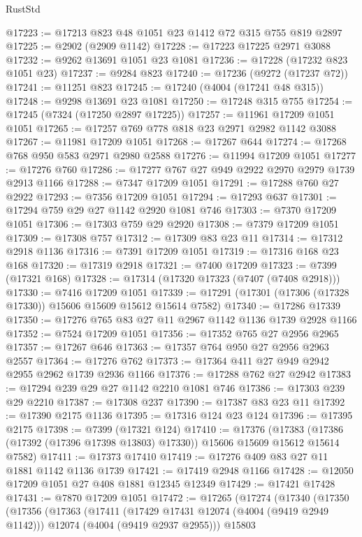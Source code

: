 \begin{lexlean}{RustStd}
\begin{coremodule}
@17223 := @17213 @823 @48 @1051 @23 @1412 @72 @315 @755 @819 @2897
@17225 := @2902 (@2909 @1142)
@17228 := @17223 @17225 @2971 @3088
@17232 := @9262 @13691 @1051 @23 @1081
@17236 := @17228 (@17232 @823 @1051 @23)
@17237 := @9284 @823
@17240 := @17236 (@9272 (@17237 @72))
@17241 := @11251 @823
@17245 := @17240 (@4004 (@17241 @48 @315))
@17248 := @9298 @13691 @23 @1081
@17250 := @17248 @315 @755
@17254 := @17245 (@7324 (@17250 @2897 @17225))
@17257 := @11961 @17209 @1051 @1051
@17265 := @17257 @769 @778 @818 @23 @2971 @2982 @1142 @3088
@17267 := @11981 @17209 @1051
@17268 := @17267 @644
@17274 := @17268 @768 @950 @583 @2971 @2980 @2588
@17276 := @11994 @17209 @1051
@17277 := @17276 @760
@17286 := @17277 @767 @27 @949 @2922 @2970 @2979 @1739 @2913 @1166
@17288 := @7347 @17209 @1051
@17291 := @17288 @760 @27 @2922
@17293 := @7356 @17209 @1051
@17294 := @17293 @637
@17301 := @17294 @759 @29 @27 @1142 @2920 @1081 @746
@17303 := @7370 @17209 @1051
@17306 := @17303 @759 @29 @2920
@17308 := @7379 @17209 @1051
@17309 := @17308 @757
@17312 := @17309 @83 @23 @11
@17314 := @17312 @2918 @1136
@17316 := @7391 @17209 @1051
@17319 := @17316 @168 @23 @168
@17320 := @17319 @2918
@17321 := @7400 @17209
@17323 := @7399 (@17321 @168)
@17328 := @17314 (@17320 @17323 (@7407 (@7408 @2918)))
@17330 := @7416 @17209 @1051
@17339 := @17291 (@17301 (@17306 (@17328 @17330)) @15606 @15609 @15612 @15614 @7582)
@17340 := @17286 @17339
@17350 := @17276 @765 @83 @27 @11 @2967 @1142 @1136 @1739 @2928 @1166
@17352 := @7524 @17209 @1051
@17356 := @17352 @765 @27 @2956 @2965
@17357 := @17267 @646
@17363 := @17357 @764 @950 @27 @2956 @2963 @2557
@17364 := @17276 @762
@17373 := @17364 @411 @27 @949 @2942 @2955 @2962 @1739 @2936 @1166
@17376 := @17288 @762 @27 @2942
@17383 := @17294 @239 @29 @27 @1142 @2210 @1081 @746
@17386 := @17303 @239 @29 @2210
@17387 := @17308 @237
@17390 := @17387 @83 @23 @11
@17392 := @17390 @2175 @1136
@17395 := @17316 @124 @23 @124
@17396 := @17395 @2175
@17398 := @7399 (@17321 @124)
@17410 := @17376
    (@17383 (@17386 (@17392 (@17396 @17398 @13803) @17330)) @15606 @15609 @15612 @15614 @7582)
@17411 := @17373 @17410
@17419 := @17276 @409 @83 @27 @11 @1881 @1142 @1136 @1739
@17421 := @17419 @2948 @1166
@17428 := @12050 @17209 @1051 @27 @408 @1881 @12345 @12349
@17429 := @17421 @17428
@17431 := @7870 @17209 @1051
@17472 := @17265
    (@17274
      (@17340
        (@17350
          (@17356
            (@17363
              (@17411
                (@17429 @17431 @12074 (@4004 (@9419 @2949 @1142)))
                @12074
                (@4004 (@9419 @2937 @2955)))
              @15803

\end{coremodule}
\end{lexlean}
